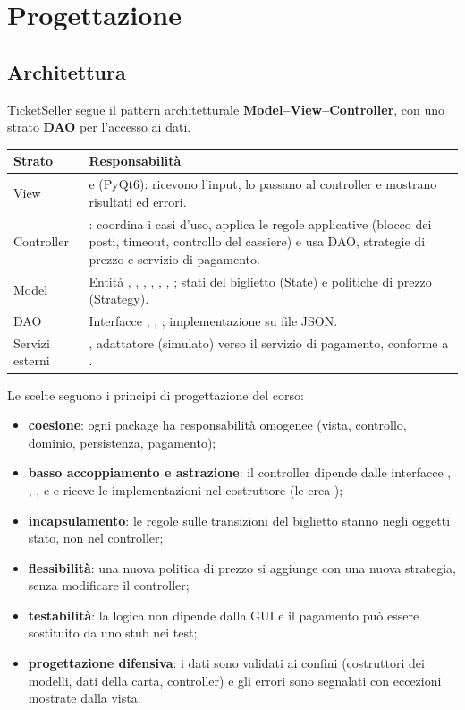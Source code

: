 \section{Progettazione}
\label{sec:progettazione}

\subsection{Architettura}

TicketSeller segue il pattern architetturale \textbf{Model--View--Controller}, con uno strato \textbf{DAO} per l'accesso ai dati.

\begin{tabularx}{\textwidth}{@{}L{2.9cm}Y@{}}
\toprule
\textbf{Strato} & \textbf{Responsabilità} \\
\midrule
View &  e  (PyQt6): ricevono l'input, lo passano al controller e mostrano risultati ed errori. \\
Controller & : coordina i casi d'uso, applica le regole applicative (blocco dei posti, timeout, controllo del cassiere) e usa DAO, strategie di prezzo e servizio di pagamento. \\
Model & Entità , , , , , , ; stati del biglietto (State) e politiche di prezzo (Strategy). \\
DAO & Interfacce , , ; implementazione  su file JSON. \\
Servizi esterni & , adattatore (simulato) verso il servizio di pagamento, conforme a . \\
\bottomrule
\end{tabularx}

Le scelte seguono i principi di progettazione del corso:

\begin{itemize}
    \item \textbf{coesione}: ogni package ha responsabilità omogenee (vista, controllo, dominio, persistenza, pagamento);
    \item \textbf{basso accoppiamento e astrazione}: il controller dipende dalle interfacce , , ,  e  e riceve le implementazioni nel costruttore (le crea );
    \item \textbf{incapsulamento}: le regole sulle transizioni del biglietto stanno negli oggetti stato, non nel controller;
    \item \textbf{flessibilità}: una nuova politica di prezzo si aggiunge con una nuova strategia, senza modificare il controller;
    \item \textbf{testabilità}: la logica non dipende dalla GUI e il pagamento può essere sostituito da uno stub nei test;
    \item \textbf{progettazione difensiva}: i dati sono validati ai confini (costruttori dei modelli, dati della carta, controller) e gli errori sono segnalati con eccezioni mostrate dalla vista.
\end{itemize}


